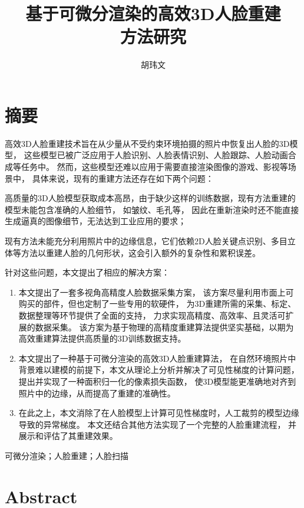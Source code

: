 \documentclass{scutmaster}
\title{基于可微分渲染的高效3D人脸重建\\方法研究}
\author{胡玮文}
\begin{document}
\maketitle
\hideinblind{
    \maketitleEN
    \nominationpage
    \declareoforiginality
}

\frontmatter
\chapter{摘要}

高效3D人脸重建技术旨在从少量从不受约束环境拍摄的照片中恢复出人脸的3D模型，
这些模型已被广泛应用于人脸识别、人脸表情识别、人脸跟踪、人脸动画合成等任务中。
然而，这些模型还难以应用于需要直接渲染图像的游戏、影视等场景中，
具体来说，现有的重建方法还存在如下两个问题：
\begin{enumerate*}
\item 高质量的3D人脸模型获取成本高昂，由于缺少这样的训练数据，现有方法重建的模型未能包含准确的人脸细节，
如皱纹、毛孔等，
因此在重新渲染时还不能直接生成逼真的图像细节，无法达到工业应用的要求；
\item 现有方法未能充分利用照片中的边缘信息，它们依赖2D人脸关键点识别、多目立体等方法以重建人脸的几何形状，这会引入额外的复杂性和累积误差。
\end{enumerate*}

针对这些问题，本文提出了相应的解决方案：
\begin{enumerate}
\item 本文提出了一套多视角高精度人脸数据采集方案，
该方案尽量利用市面上可购买的部件，但也定制了一些专用的软硬件，
为3D重建所需的采集、标定、数据整理等环节提供了全面的支持，
力求实现高精度、高效率、且灵活可扩展的数据采集。
该方案为基于物理的高精度重建算法提供坚实基础，以期为高效重建算法提供高质量的3D训练数据支持。
\item 本文提出了一种基于可微分渲染的高效3D人脸重建算法，
在自然环境照片中背景难以建模的前提下，本文从理论上分析并解决了可见性梯度的计算问题，
提出并实现了一种面积归一化的像素损失函数，
使3D模型能更准确地对齐到照片中的边缘，从而提高了重建的准确性。
\item 在此之上，本文消除了在人脸模型上计算可见性梯度时，人工裁剪的模型边缘导致的异常梯度。
本文还结合其他方法实现了一个完整的人脸重建流程，
并展示和评估了其重建效果。
\end{enumerate}

 可微分渲染；人脸重建；人脸扫描

\chapter{Abstract}
\end{document}
